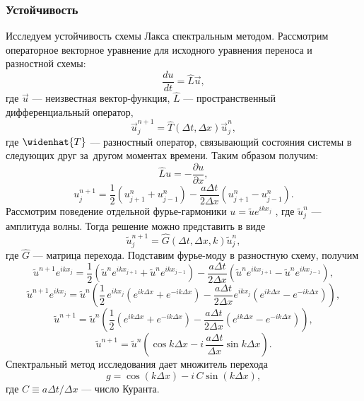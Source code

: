 \documentclass[12pt,a4paper]{article}
\begin{document}
	\subsubsection{Устойчивость}
	Исследуем устойчивость схемы Лакса спектральным методом. Рассмотрим операторное векторное уравнение для исходного уравнения переноса и разностной схемы:
	\begin{equation}
		\frac{du}{dt} = \hat{L} \vec{u},
	\end{equation}
	где $\vec{u}$ --- неизвестная вектор-функция, $\hat{L}$ --- пространственный дифференциальный оператор,
	\begin{equation}
		\vec{u}_j^{n+1} = \hat{T}(\Delta t, \Delta x)\vec{u}_j^n,
	\end{equation}
	где $\widenhat{T}$ –-- разностный оператор, связывающий состояния системы в следующих друг за~другом моментах времени.
	Таким образом получим:
	\begin{equation}
		\hat{L} u = - \frac{\partial u}{\partial x},
	\end{equation}
	\begin{equation}
		u_j^{n+1} = \frac{1}{2} \left(u_{j+1}^{n} + u_{j-1}^{n}\right) - \frac{a \Delta t}{2 \Delta x}\left(u_{j+1}^{n} - u_{j-1}^{n}\right).
	\end{equation}
	Рассмотрим поведение отдельной фурье-гармоники $u = \widetilde{u} e^{ikx_j}$ , где $\widetilde{u}_j^{n}$ --- амплитуда волны. Тогда решение можно представить в виде 
	\begin{equation}
		\widetilde{u}_j^{n+1} = \hat{G}(\Delta t, \Delta x, k)\widetilde{u}_j^{n},
	\end{equation}
	где $\hat{G}$ --- матрица перехода.
	Подставим фурье-моду  в разностную схему, получим
	\begin{equation}
		\widetilde{u}^{n+1} e^{ikx_j} = \frac{1}{2}\left(\widetilde{u}^{n} e^{ikx_{j+1}} + \widetilde{u}^{n} e^{ikx_{j-1}}\right) - \frac{a \Delta t}{2 \Delta x}\left(\widetilde{u}^{n} e^{ikx_{j+1}} - \widetilde{u}^{n} e^{ikx_{j-1}}\right),
	\end{equation}
	\begin{equation}
		\widetilde{u}^{n+1} e^{ikx_j} = \widetilde{u}^{n}\left(\frac{1}{2}\,e^{ikx_j}\left( e^{ik\Delta x} + e^{-ik\Delta x}\right) - \frac{a \Delta t}{2 \Delta x}e^{ikx_j}\left(e^{ik\Delta x} - e^{-ik\Delta x}\right)\right),
	\end{equation}
	\begin{equation}
		\widetilde{u}^{n+1} = \widetilde{u}^{n}\left(\frac{1}{2}\left( e^{ik\Delta x} + e^{-ik\Delta x}\right) - \frac{a \Delta t}{2 \Delta x}\left(e^{ik\Delta x} - e^{-ik\Delta x}\right)\right),
	\end{equation}
	\begin{equation}
		\widetilde{u}^{n+1} = \widetilde{u}^{n}\left(\cos{k\Delta x} - i\,\frac{a \Delta t}{\Delta x}\sin{k\Delta x}\right).
	\end{equation}
	Спектральный метод исследования дает множитель перехода
	\begin{equation}\label{transition_multiplier}
		g = \cos{(k\Delta x)} - i\,C\sin{(k\Delta x)},
	\end{equation}
	где $C \equiv a\Delta t / \Delta x$ --- число Куранта.
	
\end{document}
